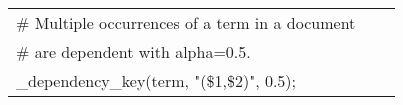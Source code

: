 \begin{tabular}{lcl}
\# Multiple occurrences of a term in a document\\
\# are dependent with alpha=0.5.\\
\_dependency\_key(term, "(\$1,\$2)", 0.5);\\
\end{tabular}
